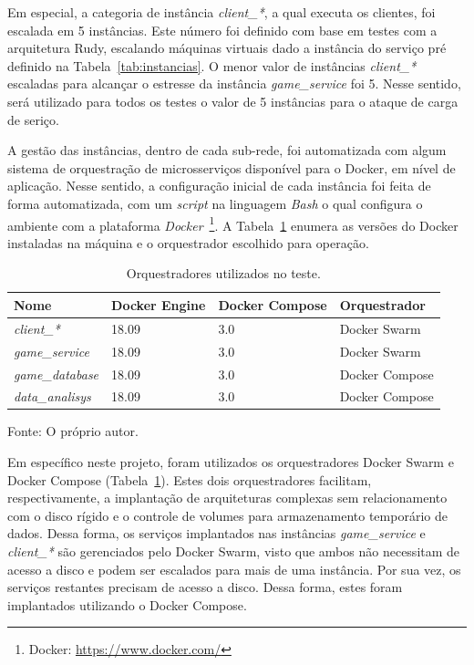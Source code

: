 Em especial, a categoria de instância \textit{client\_*}, a qual executa os clientes, foi escalada em 5 instâncias.
%
Este número foi definido com base em testes com a arquitetura Rudy, escalando máquinas virtuais dado a instância do serviço pré definido na Tabela~\ref{tab:instancias}.
%
O menor valor de instâncias \textit{client\_*} escaladas para alcançar o estresse da instância \textit{game\_service} foi 5.
%
Nesse sentido, será utilizado para todos os testes o valor de 5 instâncias para o ataque de carga de seriço.


A gestão das instâncias, dentro de cada sub-rede, foi automatizada com algum sistema de orquestração de microsserviços disponível para o Docker, em nível de aplicação.
%
Nesse sentido, a configuração inicial de cada instância foi feita de forma automatizada, com um \textit{script} na linguagem \textit{Bash} o qual configura o ambiente com a plataforma \textit{Docker}~\footnote{Docker: \url{https://www.docker.com/}}.
%
A Tabela~\ref{tab:docker_versoes} enumera as versões do Docker instaladas na máquina e o orquestrador escolhido para operação.

\begin{table}[htb!]
    \centering
    \caption{Orquestradores utilizados no teste.}
    \label{tab:docker_versoes}
    \begin{tabular}{|l|l|l|l|}
    \hline
        Nome                    & Docker Engine & Docker Compose & Orquestrador   \\ \hline
        \textit{client\_*}      & 18.09         & 3.0            & Docker Swarm   \\ \hline
        \textit{game\_service}  & 18.09         & 3.0            & Docker Swarm   \\ \hline
        \textit{game\_database} & 18.09         & 3.0            & Docker Compose \\ \hline
        \textit{data\_analisys} & 18.09         & 3.0            & Docker Compose \\ \hline
    \end{tabular}

    Fonte: O próprio autor.
\end{table}

Em específico neste projeto, foram utilizados os orquestradores Docker Swarm e Docker Compose (Tabela~\ref{tab:docker_versoes}).
%
Estes dois orquestradores facilitam, respectivamente, a implantação de arquiteturas complexas sem relacionamento com o disco rígido e o controle de volumes para armazenamento temporário de dados.
%
Dessa forma, os serviços implantados nas instâncias \textit{game\_service} e \textit{client\_*} são gerenciados pelo Docker Swarm, visto que ambos não necessitam de acesso a disco e podem ser escalados para mais de uma instância.
%
Por sua vez, os serviços restantes precisam de acesso a disco. 
%
Dessa forma, estes foram implantados utilizando o Docker Compose.


